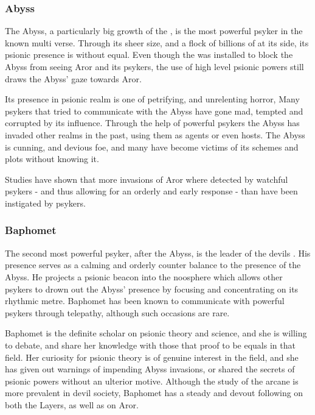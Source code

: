 \subsubsection{Abyss}

The Abyss, a particularly big growth of the , is the most
powerful psyker in the known multi verse. Through its sheer size, and a flock
of billions of  at its side, its psionic presence is
without equal. Even though the  was installed to block
the Abyss from seeing Aror and its psykers, the use of high level psionic
powers still draws the Abyss' gaze towards Aror.

Its presence in psionic realm is one of petrifying, and unrelenting horror,
Many psykers that tried to communicate with the Abyss have gone mad, tempted
and corrupted by its influence. Through the help of powerful psykers the Abyss
has invaded other realms in the past, using them as agents or even hosts. The
Abyss is cunning, and devious foe, and many have become victims of its schemes
and plots without knowing it.

Studies have shown that more invasions of Aror where detected by watchful
psykers - and thus allowing for an orderly and early response - than have
been instigated by psykers.


\subsubsection{Baphomet}

The second most powerful psyker, after the Abyss, is the leader of the
devils . His presence serves as a calming and orderly
counter balance to the presence of the Abyss. He projects a psionic beacon
into the noosphere which allows other psykers to drown out the Abyss' presence
by focusing and concentrating on its rhythmic metre. Baphomet has been known
to communicate with powerful psykers through telepathy, although such
occasions are rare.

Baphomet is the definite scholar on psionic theory and science, and she is
willing to debate, and share her knowledge with those that proof to be equals
in that field. Her curiosity for psionic theory is of genuine interest in
the field, and she has given out warnings of impending Abyss invasions, or
shared the secrets of psionic powers without an ulterior motive. Although
the study of the arcane is more prevalent in devil society, Baphomet has a
steady and devout following on both the Layers, as well as on Aror.

